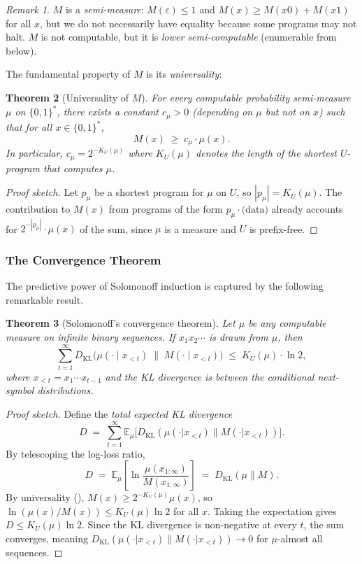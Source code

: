 \documentclass[11pt,a4paper]{article}
\newtheorem{theorem}{Theorem}[section]
\theoremstyle{definition}
\theoremstyle{remark}
\newtheorem{remark}[theorem]{Remark}
\newcommand{\Bstar}{\{0,1\}^*}
\newcommand{\DKL}{D_{\mathrm{KL}}}
\begin{document}
\begin{remark}
$M$ is a \emph{semi-measure}: $M(\varepsilon)\le 1$ and
$M(x)\ge M(x0)+M(x1)$ for all $x$, but we do not necessarily have equality
because some programs may not halt.  $M$ is not computable, but it is
\emph{lower semi-computable} (enumerable from below).
\end{remark}

The fundamental property of $M$ is its \emph{universality}:

\begin{theorem}[Universality of \boldmath$M$]\label{thm:universality}
For every computable probability semi-measure $\mu$ on $\Bstar$, there exists
a constant $c_\mu>0$ (depending on $\mu$ but not on $x$) such that for all
$x\in\Bstar$,
\[
  M(x) \;\ge\; c_\mu\cdot\mu(x).
\]
In particular, $c_\mu = 2^{-K_U(\mu)}$ where $K_U(\mu)$ denotes the
length of the shortest $U$-program that computes $\mu$.
\end{theorem}

\begin{proof}[Proof sketch]
Let $p_\mu$ be a shortest program for $\mu$ on $U$, so $|p_\mu|=K_U(\mu)$.
The contribution to $M(x)$ from programs of the form $p_\mu \cdot \text{(data)}$
already accounts for $2^{-|p_\mu|}\cdot\mu(x)$ of the sum, since $\mu$ is
a measure and $U$ is prefix-free.
\end{proof}

\subsubsection{The Convergence Theorem}

The predictive power of Solomonoff induction is captured by the following
remarkable result.

\begin{theorem}[Solomonoff's convergence theorem]\label{thm:convergence}
Let $\mu$ be any computable measure on infinite binary sequences.
If $x_1 x_2\cdots$ is drawn from $\mu$, then
\[
  \sum_{t=1}^{\infty}
  \DKL\!\bigl(\mu(\cdot\mid x_{<t})\;\big\|\;M(\cdot\mid x_{<t})\bigr)
  \;\le\;
  K_U(\mu)\cdot\ln 2,
\]
where $x_{<t}=x_1\cdots x_{t-1}$ and the KL divergence is between the
conditional next-symbol distributions.
\end{theorem}

\begin{proof}[Proof sketch]
Define the \emph{total expected KL divergence}
\[
  D \;=\; \sum_{t=1}^{\infty}\mathbb{E}_\mu\bigl[\DKL(\mu(\cdot|x_{<t})\|M(\cdot|x_{<t}))\bigr].
\]
By telescoping the log-loss ratio,
\[
  D \;=\; \mathbb{E}_\mu\!\left[\ln\frac{\mu(x_{1:\infty})}{M(x_{1:\infty})}\right]
  \;=\; \DKL(\mu\|M).
\]
By universality (), $M(x)\ge 2^{-K_U(\mu)}\mu(x)$,
so $\ln(\mu(x)/M(x))\le K_U(\mu)\ln 2$ for all $x$.
Taking the expectation gives $D\le K_U(\mu)\ln 2$.
Since the KL divergence is non-negative at every $t$, the sum
converges, meaning $\DKL(\mu(\cdot|x_{<t})\|M(\cdot|x_{<t}))\to 0$
for $\mu$-almost all sequences.
\end{proof}
\end{document}
